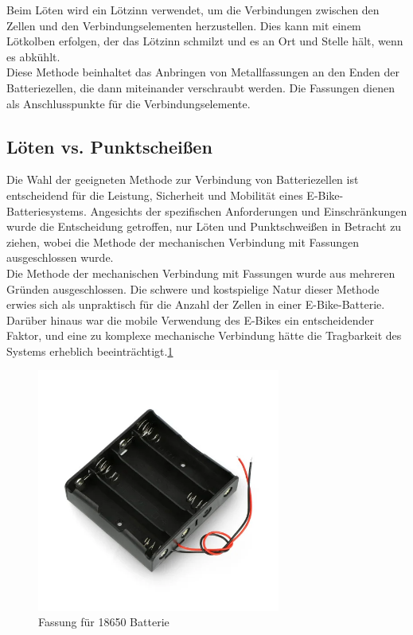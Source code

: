 Beim Löten wird ein Lötzinn verwendet, um die Verbindungen zwischen den Zellen und den Verbindungselementen herzustellen.
Dies kann mit einem Lötkolben erfolgen, der das Lötzinn schmilzt und es an Ort und Stelle hält, wenn es abkühlt.\\

Diese Methode beinhaltet das Anbringen von Metallfassungen an den Enden der Batteriezellen, die dann miteinander verschraubt werden.
Die Fassungen dienen als Anschlusspunkte für die Verbindungselemente.\\

\subsection{Löten vs. Punktscheißen}
Die Wahl der geeigneten Methode zur Verbindung von Batteriezellen ist entscheidend für die Leistung, Sicherheit und Mobilität eines E-Bike-Batteriesystems.
Angesichts der spezifischen Anforderungen und Einschränkungen wurde die Entscheidung getroffen, nur Löten und Punktschweißen in Betracht zu ziehen, wobei die Methode der mechanischen Verbindung mit Fassungen ausgeschlossen wurde.\\

Die Methode der mechanischen Verbindung mit Fassungen wurde aus mehreren Gründen ausgeschlossen.
Die schwere und kostspielige Natur dieser Methode erwies sich als unpraktisch für die Anzahl der Zellen in einer E-Bike-Batterie.
Darüber hinaus war die mobile Verwendung des E-Bikes ein entscheidender Faktor, und eine zu komplexe mechanische Verbindung hätte die Tragbarkeit des Systems erheblich beeinträchtigt.\ref{fig:2}\\
\begin{figure}[h]
    \centering
    \includegraphics[width=8cm]{images/korb-fur-4-18650-akkus-reihenschaltung.png}
    \caption{Fassung für 18650 Batterie\cite{.02.03.2024}}%
    \label{fig:2}
\end{figure}


